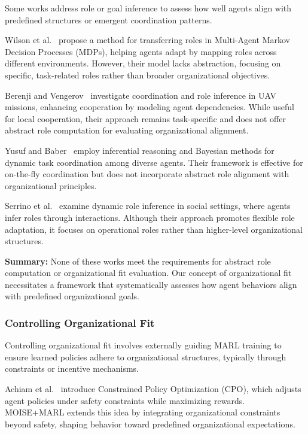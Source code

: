 \documentclass[sigconf,anonymous]{aamas}
\begin{document}
Some works address role or goal inference to assess how well agents align with predefined structures or emergent coordination patterns.

Wilson et al.~\cite{wilson2008learning} propose a method for transferring roles in Multi-Agent Markov Decision Processes (MDPs), helping agents adapt by mapping roles across different environments. However, their model lacks abstraction, focusing on specific, task-related roles rather than broader organizational objectives.

Berenji and Vengerov~\cite{berenji2000learning} investigate coordination and role inference in UAV missions, enhancing cooperation by modeling agent dependencies. While useful for local cooperation, their approach remains task-specific and does not offer abstract role computation for evaluating organizational alignment.

Yusuf and Baber~\cite{yusuf2020inferential} employ inferential reasoning and Bayesian methods for dynamic task coordination among diverse agents. Their framework is effective for on-the-fly coordination but does not incorporate abstract role alignment with organizational principles.

Serrino et al.~\cite{serrino2019finding} examine dynamic role inference in social settings, where agents infer roles through interactions. Although their approach promotes flexible role adaptation, it focuses on operational roles rather than higher-level organizational structures.

\medskip

\noindent \textbf{Summary:} None of these works meet the requirements for abstract role computation or organizational fit evaluation. Our concept of organizational fit necessitates a framework that systematically assesses how agent behaviors align with predefined organizational goals.

\subsubsection{Controlling Organizational Fit}

Controlling organizational fit involves externally guiding MARL training to ensure learned policies adhere to organizational structures, typically through constraints or incentive mechanisms.

Achiam et al.~\cite{achiam2017cpo} introduce Constrained Policy Optimization (CPO), which adjusts agent policies under safety constraints while maximizing rewards. MOISE+MARL extends this idea by integrating organizational constraints beyond safety, shaping behavior toward predefined organizational expectations.
\end{document}
